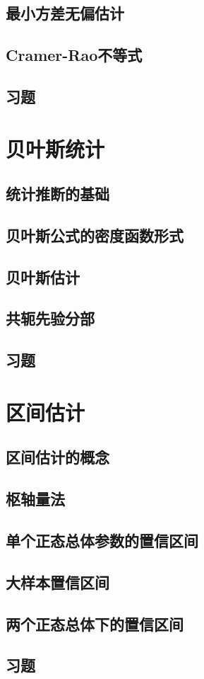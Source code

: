 \subsection{最小方差无偏估计}
\subsection{Cramer-Rao不等式}
\subsection{习题}

\section{贝叶斯统计}
\subsection{统计推断的基础}
\subsection{贝叶斯公式的密度函数形式}
\subsection{贝叶斯估计}
\subsection{共轭先验分部}
\subsection{习题}

\section{区间估计}
\subsection{区间估计的概念}
\subsection{枢轴量法}
\subsection{单个正态总体参数的置信区间}
\subsection{大样本置信区间}
\subsection{两个正态总体下的置信区间}
\subsection{习题}
